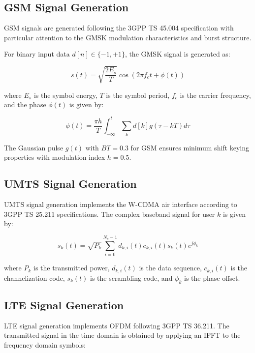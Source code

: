 \documentclass[twocolumn,10pt]{article}
\begin{document}
\subsection{GSM Signal Generation}

GSM signals are generated following the 3GPP TS 45.004 specification with particular attention to the GMSK modulation characteristics and burst structure.

For binary input data $d[n] \in \{-1, +1\}$, the GMSK signal is generated as:

\begin{equation}
s(t) = \sqrt{\frac{2E_s}{T}} \cos\left(2\pi f_c t + \phi(t)\right)
\end{equation}

where $E_s$ is the symbol energy, $T$ is the symbol period, $f_c$ is the carrier frequency, and the phase $\phi(t)$ is given by:

\begin{equation}
\phi(t) = \frac{\pi h}{T} \int_{-\infty}^{t} \sum_{k} d[k] g(\tau - kT) d\tau
\end{equation}

The Gaussian pulse $g(t)$ with $BT = 0.3$ for GSM ensures minimum shift keying properties with modulation index $h = 0.5$.

\subsection{UMTS Signal Generation}

UMTS signal generation implements the W-CDMA air interface according to 3GPP TS 25.211 specifications. The complex baseband signal for user $k$ is given by:

\begin{equation}
s_k(t) = \sqrt{P_k} \sum_{i=0}^{N_c-1} d_{k,i}(t) c_{k,i}(t) s_{k}(t) e^{j\phi_k}
\end{equation}

where $P_k$ is the transmitted power, $d_{k,i}(t)$ is the data sequence, $c_{k,i}(t)$ is the channelization code, $s_k(t)$ is the scrambling code, and $\phi_k$ is the phase offset.

\subsection{LTE Signal Generation}

LTE signal generation implements OFDM following 3GPP TS 36.211. The transmitted signal in the time domain is obtained by applying an IFFT to the frequency domain symbols:
\end{document}
